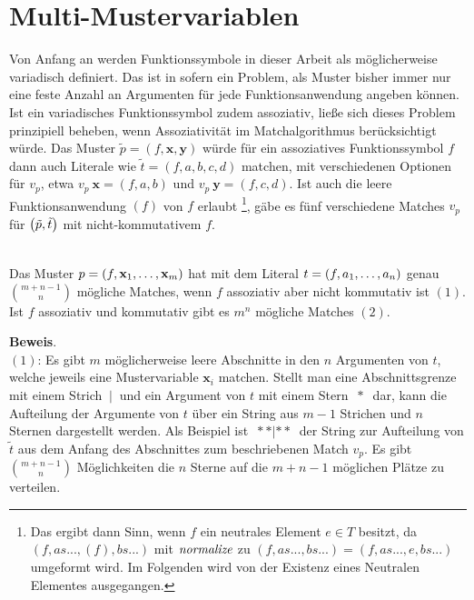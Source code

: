 \section{Multi-Mustervariablen} \label{subsecMulti}

Von Anfang an werden Funktionssymbole in dieser Arbeit als möglicherweise variadisch definiert. Das ist in sofern ein Problem, als Muster bisher immer nur eine feste Anzahl an Argumenten für jede Funktionsanwendung angeben können. Ist ein variadisches Funktionssymbol zudem assoziativ, ließe sich dieses Problem prinzipiell beheben, wenn Assoziativität im Matchalgorithmus berücksichtigt würde. Das Muster $\tilde p = (f, \mathbf x, \mathbf y)$ würde für ein assoziatives Funktionssymbol $f$ dann auch Literale wie $\tilde t = (f, a, b, c, d)$ matchen, mit verschiedenen Optionen für $v_p$, etwa $v_p~\mathbf x = (f, a, b)$ und $v_p~\mathbf y = (f, c, d)$. Ist auch die leere Funktionsanwendung $(f)$ von $f$ erlaubt \footnote{Das ergibt dann Sinn, wenn $f$ ein neutrales Element $e \in T$ besitzt, da $(f, as..., (f), bs...)$ mit $\Const{normalize}$ zu $(f, as..., bs...) = (f, as..., e, bs...)$ umgeformt wird. Im Folgenden wird von der Existenz eines Neutralen Elementes ausgegangen.}, gäbe es fünf verschiedene Matches $v_p$ für $\paren*{\tilde p, \tilde t}$ mit nicht-kommutativem $f$.

\begin{lemma}~\\ \label{lemNrAssocMatches}
Das Muster $p = (f, \elems {\mathbf x} 1 m)$ hat mit dem Literal $t = (f, \elems a 1 n)$ genau ${m + n - 1}\choose n$ mögliche Matches, wenn $f$ assoziativ aber nicht kommutativ ist $(1)$. Ist $f$ assoziativ und kommutativ gibt es $m^n$ mögliche Matches $(2)$.\\
\end{lemma}

\textbf{Beweis}.\\
$(1)$: Es gibt $m$ möglicherweise leere Abschnitte in den $n$ Argumenten von $t$, welche jeweils eine Mustervariable $\mathbf x_i$ matchen. Stellt man eine Abschnittsgrenze mit einem Strich $~|~$ und ein Argument von $t$ mit einem Stern $~*~$ dar, kann die Aufteilung der Argumente von $t$ über ein String aus $m - 1$ Strichen und $n$ Sternen dargestellt werden. 
Als Beispiel ist $~**|**~$ der String zur Aufteilung von $\tilde t$ aus dem Anfang des Abschnittes zum beschriebenen Match $v_p$.
Es gibt ${m + n - 1}\choose n$ Möglichkeiten die $n$ Sterne auf die ${m + n - 1}$ möglichen Plätze zu verteilen.\\

